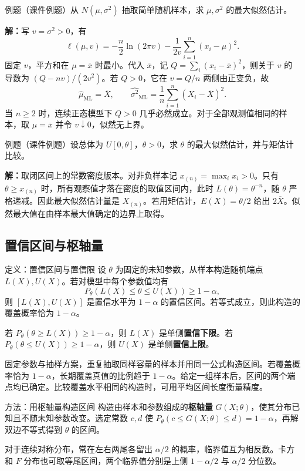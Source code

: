 \documentclass[UTF8,fontset=none,zihao=-4,a4paper]{ctexart}
\newcommand{\term}[1]{\textbf{#1}}
\newcommand{\example}[1]{\begin{infobox}{例题}#1\end{infobox}}
\newcommand{\solution}{\par\noindent\textbf{解：}}
\begin{document}
\example{（课件例题）从 $N(\mu,\sigma^2)$ 抽取简单随机样本，求 $\mu,\sigma^2$ 的最大似然估计。}
\solution 写 $v=\sigma^2>0$，有
\[
\ell(\mu,v)=-\frac{n}{2}\ln(2\pi v)-\frac{1}{2v}\sum_{i=1}^n(x_i-\mu)^2.
\]
固定 $v$，平方和在 $\mu=\overline x$ 时最小。代入 $\overline x$，记 $Q=\sum_i(x_i-\overline x)^2$，则关于 $v$ 的导数为 $(Q-nv)/(2v^2)$。若 $Q>0$，它在 $v=Q/n$ 两侧由正变负，故
\[
\widehat\mu_{\mathrm{ML}}=\overline X,\qquad
\widehat{\sigma^2}_{\mathrm{ML}}=\frac{1}{n}\sum_{i=1}^n(X_i-\overline X)^2 .
\]
当 $n\ge2$ 时，连续正态模型下 $Q>0$ 几乎必然成立。对于全部观测值相同的样本，取 $\mu=\overline x$ 并令 $v\downarrow0$，似然无上界。

\example{（课件例题）设总体为 $U[0,\theta]$，$\theta>0$，求 $\theta$ 的最大似然估计，并与矩估计比较。}
\solution 取闭区间上的常数密度版本。对非负样本记 $x_{(n)}=\max_i x_i>0$。只有 $\theta\ge x_{(n)}$ 时，所有观察值才落在密度的取值区间内，此时 $L(\theta)=\theta^{-n}$，随 $\theta$ 严格递减。因此最大似然估计量是 $X_{(n)}$。若用矩估计，$E(X)=\theta/2$ 给出 $2\overline X$。似然最大值在由样本最大值确定的边界上取得。

\subsection{置信区间与枢轴量}
\begin{infobox}{定义：置信区间与置信限}
设 $\theta$ 为固定的未知参数，从样本构造随机端点 $L(X),U(X)$。若对模型中每个参数值均有
\[
P_\theta\!\left(L(X)\le\theta\le U(X)\right)\ge 1-\alpha,
\]
则 $[L(X),U(X)]$ 是置信水平为 $1-\alpha$ 的置信区间。若等式成立，则此构造的覆盖概率恰为 $1-\alpha$。

若 $P_\theta(\theta\ge L(X))\ge1-\alpha$，则 $L(X)$ 是单侧\term{置信下限}。若 $P_\theta(\theta\le U(X))\ge1-\alpha$，则 $U(X)$ 是单侧\term{置信上限}。
\end{infobox}
固定参数与抽样方案，重复抽取同样容量的样本并用同一公式构造区间。若覆盖概率恰为 $1-\alpha$，长期覆盖真值的比例趋于 $1-\alpha$。给定一组样本后，区间的两个端点均已确定。比较覆盖水平相同的构造时，可用平均区间长度衡量精度。

\begin{infobox}{方法：用枢轴量构造区间}
构造由样本和参数组成的\term{枢轴量} $G(X;\theta)$，使其分布已知且不随未知参数改变。选定常数 $c,d$ 使 $P_\theta(c\le G(X;\theta)\le d)=1-\alpha$，再解双边不等式得到 $\theta$ 的区间。
\end{infobox}
对于连续对称分布，常在左右两尾各留出 $\alpha/2$ 的概率，临界值互为相反数。卡方和 $F$ 分布也可取等尾区间，两个临界值分别是上侧 $1-\alpha/2$ 与 $\alpha/2$ 分位数。
\end{document}
